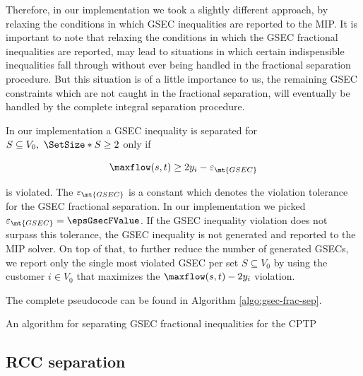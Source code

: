 Therefore, in our implementation we took a slightly different approach, by relaxing the conditions in which GSEC inequalities are reported to the MIP.
It is important to note that relaxing the conditions in which the GSEC fractional inequalities are reported, may lead to situations in which certain indispensible inequalities fall through without ever being handled in the fractional separation procedure.
But this situation is of a little importance to us, the remaining GSEC constraints which are not caught in the fractional separation, will eventually be handled by the complete integral separation procedure.

In our implementation a GSEC inequality is separated for $S \subseteq V_0,\ \SetSize*{S} \ge 2$ only if

\begin{equation}
	\maxflow(s, t) \ge 2 y_i - \varepsilon_{\mt{GSEC}}
\end{equation}

is violated.
The $\varepsilon_{\mt{GSEC}}$ is a constant which denotes the violation tolerance for the GSEC fractional separation.
In our implementation we picked $\varepsilon_{\mt{GSEC}} = \epsGsecFValue$.
If the GSEC inequality violation does not surpass this tolerance, the GSEC inequality is not generated and reported to the MIP solver.
On top of that, to further reduce the number of generated GSECs, we report only the single most violated GSEC per set $S \subseteq V_0$ by using the customer $i \in V_0$ that maximizes the $\maxflow(s, t) - 2 y_i$ violation.

The complete pseudocode can be found in Algorithm \ref{algo:gsec-frac-sep}.

\begin{algorithm}
	\caption{An algorithm for separating GSEC fractional inequalities for the CPTP}
	\label{algo:gsec-frac-sep}
	
\end{algorithm}

\subsection{RCC separation}
\label{sec:impl-rcc-separation}

